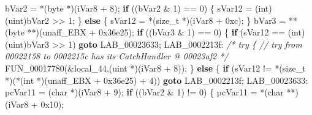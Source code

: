 \documentclass[
]{article}
\newenvironment{Shaded}{}{}
\newcommand{\BaseNTok}[1]{\textcolor[rgb]{0.25,0.63,0.44}{#1}}
\newcommand{\CommentTok}[1]{\textcolor[rgb]{0.38,0.63,0.69}{\textit{#1}}}
\newcommand{\ControlFlowTok}[1]{\textcolor[rgb]{0.00,0.44,0.13}{\textbf{#1}}}
\newcommand{\DataTypeTok}[1]{\textcolor[rgb]{0.56,0.13,0.00}{#1}}
\newcommand{\DecValTok}[1]{\textcolor[rgb]{0.25,0.63,0.44}{#1}}
\newcommand{\NormalTok}[1]{#1}
\newcommand{\OperatorTok}[1]{\textcolor[rgb]{0.40,0.40,0.40}{#1}}
\begin{document}
\begin{Shaded}
\begin{Highlighting}[]
\NormalTok{  bVar2 }\OperatorTok{=} \OperatorTok{*(}\NormalTok{byte }\OperatorTok{*)(}\NormalTok{iVar8 }\OperatorTok{+} \DecValTok{8}\OperatorTok{);}
  \ControlFlowTok{if} \OperatorTok{((}\NormalTok{bVar2 }\OperatorTok{\&} \DecValTok{1}\OperatorTok{)} \OperatorTok{==} \DecValTok{0}\OperatorTok{)} \OperatorTok{\{}
\NormalTok{    sVar12 }\OperatorTok{=} \OperatorTok{(}\DataTypeTok{int}\OperatorTok{)(}\NormalTok{uint}\OperatorTok{)}\NormalTok{bVar2 }\OperatorTok{\textgreater{}\textgreater{}} \DecValTok{1}\OperatorTok{;}
  \OperatorTok{\}}
  \ControlFlowTok{else} \OperatorTok{\{}
\NormalTok{    sVar12 }\OperatorTok{=} \OperatorTok{*(}\DataTypeTok{size\_t} \OperatorTok{*)(}\NormalTok{iVar8 }\OperatorTok{+} \BaseNTok{0xc}\OperatorTok{);}
  \OperatorTok{\}}
\NormalTok{  bVar3 }\OperatorTok{=} \OperatorTok{**(}\NormalTok{byte }\OperatorTok{**)(}\NormalTok{unaff\_EBX }\OperatorTok{+} \BaseNTok{0x36e25}\OperatorTok{);}
  \ControlFlowTok{if} \OperatorTok{((}\NormalTok{bVar3 }\OperatorTok{\&} \DecValTok{1}\OperatorTok{)} \OperatorTok{==} \DecValTok{0}\OperatorTok{)} \OperatorTok{\{}
    \ControlFlowTok{if} \OperatorTok{(}\NormalTok{sVar12 }\OperatorTok{==} \OperatorTok{(}\DataTypeTok{int}\OperatorTok{)(}\NormalTok{uint}\OperatorTok{)}\NormalTok{bVar3 }\OperatorTok{\textgreater{}\textgreater{}} \DecValTok{1}\OperatorTok{)} \ControlFlowTok{goto}\NormalTok{ LAB\_00023633}\OperatorTok{;}
\NormalTok{LAB\_0002213f}\OperatorTok{:}
                    \CommentTok{/* try \{ // try from 00022158 to 0002215c has its CatchHandler @ 00023af2 */}
\NormalTok{    FUN\_00017780}\OperatorTok{(\&}\NormalTok{local\_44}\OperatorTok{,(}\NormalTok{uint }\OperatorTok{*)(}\NormalTok{iVar8 }\OperatorTok{+} \DecValTok{8}\OperatorTok{));}
  \OperatorTok{\}}
  \ControlFlowTok{else} \OperatorTok{\{}
    \ControlFlowTok{if} \OperatorTok{(}\NormalTok{sVar12 }\OperatorTok{!=} \OperatorTok{*(}\DataTypeTok{size\_t} \OperatorTok{*)(*(}\DataTypeTok{int} \OperatorTok{*)(}\NormalTok{unaff\_EBX }\OperatorTok{+} \BaseNTok{0x36e25}\OperatorTok{)} \OperatorTok{+} \DecValTok{4}\OperatorTok{))} \ControlFlowTok{goto}\NormalTok{ LAB\_0002213f}\OperatorTok{;}
\NormalTok{LAB\_00023633}\OperatorTok{:}
\NormalTok{    pcVar11 }\OperatorTok{=} \OperatorTok{(}\DataTypeTok{char} \OperatorTok{*)(}\NormalTok{iVar8 }\OperatorTok{+} \DecValTok{9}\OperatorTok{);}
    \ControlFlowTok{if} \OperatorTok{((}\NormalTok{bVar2 }\OperatorTok{\&} \DecValTok{1}\OperatorTok{)} \OperatorTok{!=} \DecValTok{0}\OperatorTok{)} \OperatorTok{\{}
\NormalTok{      pcVar11 }\OperatorTok{=} \OperatorTok{*(}\DataTypeTok{char} \OperatorTok{**)(}\NormalTok{iVar8 }\OperatorTok{+} \BaseNTok{0x10}\OperatorTok{);}

\end{Highlighting}
\end{Shaded}
\end{document}

